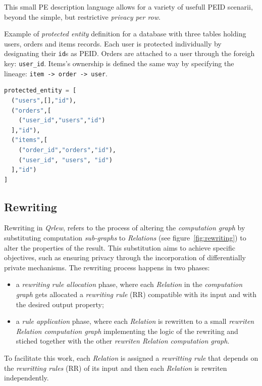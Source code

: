 \documentclass[letterpaper]{article} %
\newcommand{\qrlew}{\emph{Qrlew}}
\begin{document}
This small PE description language allows for a variety of usefull PEID scenarii, beyond the simple, but restrictive \emph{privacy per row}.

\begin{listing}[tb]
\caption{Example of \emph{protected entity} definition for a database with three tables holding users, orders and items records. Each user is protected individually by designating their \texttt{id}s as PEID. Orders are attached to a user through the foreigh key: \texttt{user\_id}. Items's ownership is defined the same way by specifying the lineage: \texttt{item -> order -> user}.}%
\label{lst:pe}
\begin{lstlisting}[language=Python]
protected_entity = [
  ("users",[],"id"),
  ("orders",[
    ("user_id","users","id")
  ],"id"),
  ("items",[
    ("order_id","orders","id"),
    ("user_id", "users", "id")
  ],"id")
]
\end{lstlisting}
\end{listing}

\subsection{Rewriting}
\label{sec:rewritting}

Rewriting in \qrlew{}, refers to the process of altering the \emph{computation graph} by substituting computation \emph{sub-graphs} to \emph{Relations} (see figure~\ref{fig:rewriting}) to alter the properties of the result. This substitution aims to achieve specific objectives, such as ensuring privacy through the incorporation of differentially private mechanisms. The rewriting process happens in two phases:
\begin{itemize}
    \item a \emph{rewriting rule allocation} phase, where each \emph{Relation} in the \emph{computation graph} gets allocated a \emph{rewriting rule} (RR) compatible with its input and with the desired output property;
    \item a \emph{rule application} phase, where each \emph{Relation} is rewritten to a small \emph{rewriten Relation computation graph} implementing the logic of the rewriting and stiched together with the other \emph{rewriten Relation computation graph}.
\end{itemize}
To facilitate this work, each \emph{Relation} is assigned a \emph{rewritting rule} that depends on the \emph{rewritting rules} (RR) of its input and then each \emph{Relation} is rewriten independently.
\end{document}
